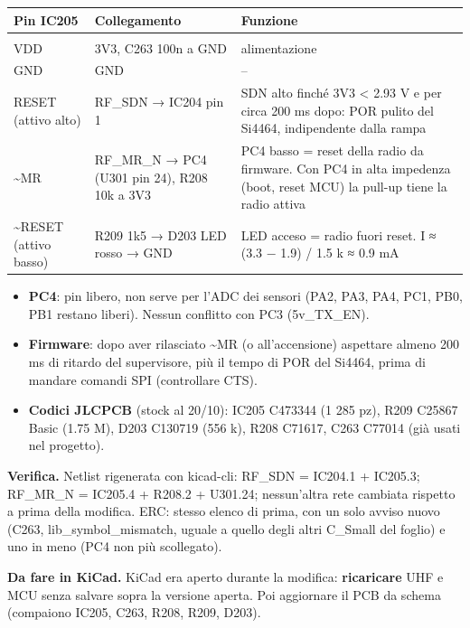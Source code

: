 {\small{}\setlength{\tabcolsep}{4pt}\renewcommand{\arraystretch}{1.1}
\begin{xltabular}{\linewidth}{>{\hsize\raggedright\arraybackslash}X>{\hsize\raggedright\arraybackslash}X>{\hsize\raggedright\arraybackslash}X}
\toprule
\textbf{Pin IC205} & \textbf{Collegamento} & \textbf{Funzione} \\
\midrule
\endhead
\midrule[0.15pt]\\\bottomrule\endfoot
\bottomrule{} VDD & 3V3, C263 100n a GND & alimentazione \\ GND & GND & – \\ RESET (attivo alto) & RF\_\allowbreak{}SDN → IC204 pin 1 & SDN alto finché 3V3 < 2.93 V e per circa 200 ms dopo: POR pulito del Si4464, indipendente dalla rampa \\ \textasciitilde{}MR & RF\_\allowbreak{}MR\_\allowbreak{}N → PC4 (U301 pin 24), R208 10k a 3V3 & PC4 basso = reset della radio da firmware. Con PC4 in alta impedenza (boot, reset MCU) la pull-up tiene la radio attiva \\ \textasciitilde{}RESET (attivo basso) & R209 1k5 → D203 LED rosso → GND & LED acceso = radio fuori reset. I ≈ (3.3 − 1.9) /\allowbreak{} 1.5 k ≈ 0.9 mA \\
\end{xltabular}}

\begin{itemize}
\item \textbf{PC4}: pin libero, non serve per l'ADC dei sensori (PA2, PA3, PA4, PC1, PB0, PB1 restano liberi). Nessun conflitto con PC3 (5v\_\allowbreak{}TX\_\allowbreak{}EN).
\item \textbf{Firmware}: dopo aver rilasciato \textasciitilde{}MR (o all'accensione) aspettare almeno 200 ms di ritardo del supervisore, più il tempo di POR del Si4464, prima di mandare comandi SPI (controllare CTS).
\item \textbf{Codici JLCPCB} (stock al 20/\allowbreak{}10): IC205 C473344 (1 285 pz), R209 C25867 Basic (1.75 M), D203 C130719 (556 k), R208 C71617, C263 C77014 (già usati nel progetto).
\end{itemize}

\textbf{Verifica.} Netlist rigenerata con kicad-cli: RF\_\allowbreak{}SDN = IC204.1 + IC205.3; RF\_\allowbreak{}MR\_\allowbreak{}N = IC205.4 + R208.2 + U301.24; nessun'altra rete cambiata rispetto a prima della modifica. ERC: stesso elenco di prima, con un solo avviso nuovo (C263, lib\_\allowbreak{}symbol\_\allowbreak{}mismatch, uguale a quello degli altri C\_\allowbreak{}Small del foglio) e uno in meno (PC4 non più scollegato).

\begin{notebox}
\textbf{Da fare in KiCad.} KiCad era aperto durante la modifica: \textbf{ricaricare} UHF e MCU senza salvare sopra la versione aperta. Poi aggiornare il PCB da schema (compaiono IC205, C263, R208, R209, D203).
\end{notebox}
